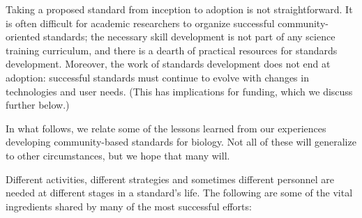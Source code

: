 Taking a proposed standard from inception to adoption is not straightforward.  It is often difficult for academic researchers to organize successful community-oriented standards; the necessary skill development is not part of any science training curriculum, and there is a dearth of practical resources for standards development.  Moreover, the work of standards development does not end at adoption: successful standards must continue to evolve with changes in technologies and user needs.  (This has implications for funding, which we discuss further below.)

In what follows, we relate some of the lessons learned from our experiences developing community-based standards for biology.  Not all of these will generalize to other circumstances, but we hope that many will.




Different activities, different strategies and sometimes different personnel are needed at different stages in a standard's life.  The following are some of the vital ingredients shared by many of the most successful efforts:

